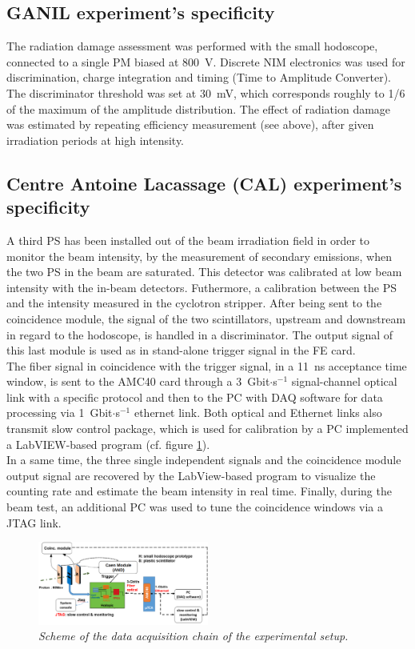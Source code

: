 \documentclass[a4paper,11pt]{article}
\begin{document}
\subsection{GANIL experiment's specificity}

The radiation damage assessment was performed with the small hodoscope, connected to a single PM biased at 800~V. Discrete NIM electronics was used for discrimination, charge integration and timing (Time to Amplitude Converter). The discriminator threshold was set at 30~mV, which corresponds roughly to 1/6 of the maximum of the amplitude distribution. The effect of radiation damage was estimated by repeating efficiency measurement (see above), after given irradiation periods at high intensity.

\subsection{Centre Antoine Lacassage (CAL) experiment's specificity}
\label{In-beam_tests}

A third PS has been installed out of the beam irradiation field in order to monitor the beam intensity, by the measurement of secondary emissions, when the two PS in the beam are saturated. This detector was calibrated at low beam intensity with the in-beam detectors. Futhermore, a calibration between the PS and the intensity measured in the cyclotron stripper. After being sent to the coincidence module, the signal of the two scintillators, upstream and downstream in regard to the hodoscope, is handled in a discriminator. The output signal of this last module is used as in stand-alone trigger signal in the FE card. \\

The fiber signal in coincidence with the trigger signal, in a 11~ns acceptance time window, is sent to the AMC40 card through a 3~Gbit$\cdot$s$^{-1}$ signal-channel optical link with a specific protocol and then to the PC with DAQ software for data processing via 1~Gbit$\cdot$s$^{-1}$ ethernet link. Both optical and Ethernet links also transmit slow control package, which is used for calibration by a PC implemented a LabVIEW-based program (cf. figure \ref{fig:Scheme_Setup_hodo}).\\ 

In a same time, the three single independent signals and the coincidence module output signal are recovered by the LabView-based program to visualize the counting rate and estimate the beam intensity in real time.
Finally, during the beam test, an additional PC was used to tune the coincidence windows via a JTAG link.
\begin{figure}[H]
\centering
\includegraphics[width=0.5\textwidth]{figures/Scheme_Setup_Nice_08_2019.pdf}
\caption{\small{\textit{Scheme of the data acquisition chain of the experimental setup.}}}
\label{fig:Scheme_Setup_hodo}
\end{figure}
\end{document}

